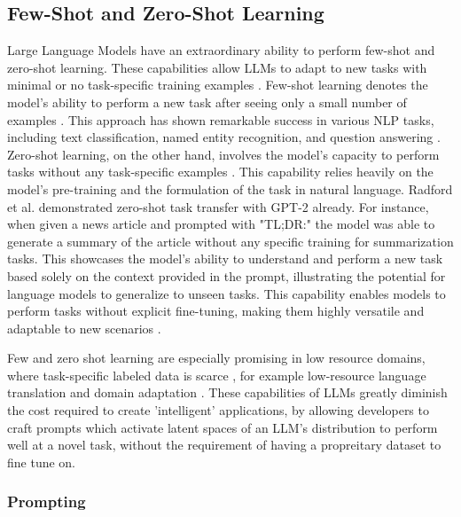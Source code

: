 \documentclass[a4paper, oneside]{discothesis}
\begin{document}
\subsection{Few-Shot and Zero-Shot Learning}
Large Language Models have an extraordinary ability to perform few-shot and zero-shot learning. These capabilities allow LLMs to adapt to new tasks with minimal or no task-specific training examples \cite{brown2020language}.
Few-shot learning denotes the model's ability to perform a new task after seeing only a small number of examples \cite{wang2020generalizing}. This approach has shown remarkable success in various NLP tasks, including text classification, named entity recognition, and question answering \cite{gao2021making}. 
Zero-shot learning, on the other hand, involves the model's capacity to perform tasks without any task-specific examples \cite{xian2018zero}. 
This capability relies heavily on the model's pre-training and the formulation of the task in natural language. 
Radford et al. \cite{radford2019language} demonstrated zero-shot task transfer with GPT-2 already. For instance, when given a news article and prompted with "TL;DR:" the model was able to generate a summary of the article without any specific training for summarization tasks. This showcases the model's ability to understand and perform a new task based solely on the context provided in the prompt, illustrating the potential for language models to generalize to unseen tasks. This capability enables models to perform tasks without explicit fine-tuning, making them highly versatile and adaptable to new scenarios \cite{min2022rethinking}.

Few and zero shot learning are especially promising in low resource domains, where task-specific labeled data is scarce \cite{hedderich2021survey}, for example low-resource language translation \cite{garcia2020multilingual} and domain adaptation \cite{gururangan2020don}. These capabilities of LLMs greatly diminish the cost required to create 'intelligent' applications, by allowing developers to craft prompts which activate latent spaces of an LLM's distribution to perform well at a novel task, without the requirement of having a propreitary dataset to fine tune on.

\subsubsection{Prompting}
\end{document}
